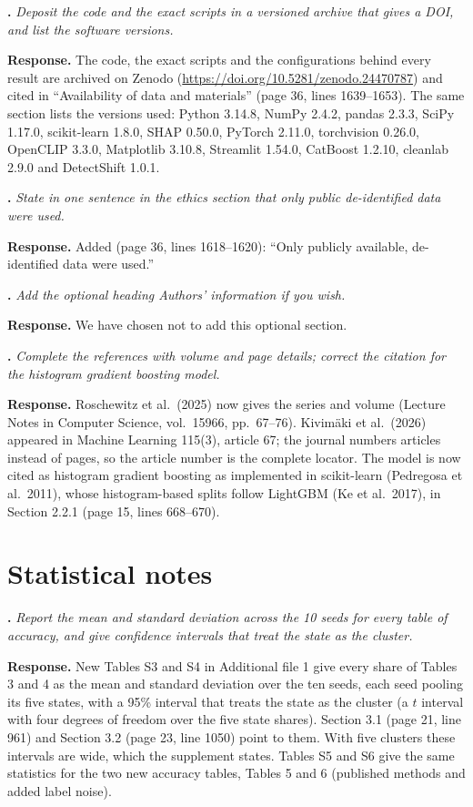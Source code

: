 \documentclass[11pt,a4paper]{article}
\newcounter{point}
\newcommand{\point}[1]{\par\medskip\stepcounter{point}\textbf{\thepoint. }\textit{#1}\par}
\newcommand{\reply}{\textbf{Response. }}
\begin{document}
\point{Deposit the code and the exact scripts in a versioned archive that gives a DOI, and list the software versions.}
\reply The code, the exact scripts and the configurations behind every result are archived on Zenodo (\url{https://doi.org/10.5281/zenodo.24470787}) and cited in ``Availability of data and materials'' (page 36, lines 1639--1653). The same section lists the versions used: Python 3.14.8, NumPy 2.4.2, pandas 2.3.3, SciPy 1.17.0, scikit-learn 1.8.0, SHAP 0.50.0, PyTorch 2.11.0, torchvision 0.26.0, OpenCLIP 3.3.0, Matplotlib 3.10.8, Streamlit 1.54.0, CatBoost 1.2.10, cleanlab 2.9.0 and DetectShift 1.0.1.

\point{State in one sentence in the ethics section that only public de-identified data were used.}
\reply Added (page 36, lines 1618--1620): ``Only publicly available, de-identified data were used.''

\point{Add the optional heading Authors' information if you wish.}
\reply We have chosen not to add this optional section.

\point{Complete the references with volume and page details; correct the citation for the histogram gradient boosting model.}
\reply Roschewitz et al.\ (2025) now gives the series and volume (Lecture Notes in Computer Science, vol.\ 15966, pp.\ 67--76). Kivimäki et al.\ (2026) appeared in Machine Learning 115(3), article 67; the journal numbers articles instead of pages, so the article number is the complete locator. The model is now cited as histogram gradient boosting as implemented in scikit-learn (Pedregosa et al.\ 2011), whose histogram-based splits follow LightGBM (Ke et al.\ 2017), in Section 2.2.1 (page 15, lines 668--670).

\section*{Statistical notes}

\point{Report the mean and standard deviation across the 10 seeds for every table of accuracy, and give confidence intervals that treat the state as the cluster.}
\reply New Tables S3 and S4 in Additional file 1 give every share of Tables 3 and 4 as the mean and standard deviation over the ten seeds, each seed pooling its five states, with a 95\% interval that treats the state as the cluster (a $t$ interval with four degrees of freedom over the five state shares). Section 3.1 (page 21, line 961) and Section 3.2 (page 23, line 1050) point to them. With five clusters these intervals are wide, which the supplement states. Tables S5 and S6 give the same statistics for the two new accuracy tables, Tables 5 and 6 (published methods and added label noise).
\end{document}
